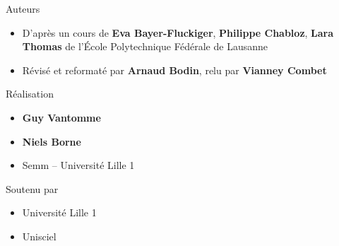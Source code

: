 \begin{frame}
\begin{minipage}{0.90\textwidth}
   \smallskip
   
  Auteurs
  \begin{itemize}
  \item D'après un cours de {\bf Eva Bayer-Fluckiger}, {\bf Philippe Chabloz}, {\bf Lara Thomas}
  de l'\'Ecole Polytechnique Fédérale de Lausanne

  
  \item Révisé et reformaté par {\bf Arnaud Bodin}, relu par {\bf Vianney Combet} 
  
    
  \end{itemize}

  \smallskip

  Réalisation
  \begin{itemize}
    \item {\bf Guy Vantomme}
    \item {\bf Niels Borne} 
    \item Semm -- Université Lille 1
  \end{itemize}

  \smallskip

  Soutenu par 
  \begin{itemize}
    \item Université Lille 1
    \item Unisciel
  \end{itemize}

  \end{minipage}  



\end{frame}


